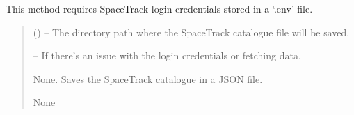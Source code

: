 \documentclass[letterpaper,10pt,english]{sphinxmanual}
\begin{document}
\begin{fulllineitems}
\begin{fulllineitems}
\sphinxAtStartPar
This method requires SpaceTrack login credentials stored in a ‘.env’ file.
\begin{quote}\begin{description}
\sphinxAtStartPar
{} () – The directory path where the SpaceTrack catalogue file will be saved.

\sphinxAtStartPar
{} – If there’s an issue with the login credentials or fetching data.

\sphinxAtStartPar
None. Saves the SpaceTrack catalogue in a JSON file.

\sphinxAtStartPar
None

\end{description}\end{quote}

\end{fulllineitems}


\begin{fulllineitems}
\label{\detokenize{fspsim.utils:fspsim.utils.SpaceCatalogue.SpaceCatalogue.load_from_file}}
\pysigstartsignatures
{}
\pysigstopsignatures
\end{fulllineitems}


\end{fulllineitems}

\end{document}
